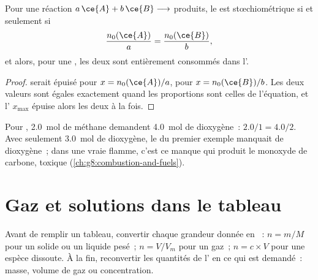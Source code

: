 \begin{proposition}\label{prop:g10:reaction-progress-table:together}
Pour une réaction $a\,\ce{A} + b\,\ce{B} \longrightarrow$ produits, le
 est stœchiométrique si et seulement si
\[
  \frac{n_0(\ce{A})}{a} = \frac{n_0(\ce{B})}{b},
\]
et alors, pour une , les deux  sont entièrement
consommés dans l'.
\end{proposition}

\begin{proof}
 serait épuisé pour $x = n_0(\ce{A})/a$,  pour
$x = n_0(\ce{B})/b$. Les deux valeurs sont égales exactement quand les
proportions sont celles de l'équation, et l' $x_{\max}$ épuise
alors les deux à la fois.
\end{proof}

\begin{example}\label{ex:g10:reaction-progress-table:stoich}
Pour , \qty{2.0}{mol} de méthane demandent
\qty{4.0}{mol} de dioxygène~: $2.0/1 = 4.0/2$. Avec seulement
\qty{3.0}{mol} de dioxygène, le  du premier exemple manquait de
dioxygène~; dans une vraie flamme, c'est ce manque qui produit le
monoxyde de carbone, toxique (\cref{ch:g8:combustion-and-fuels}).
\end{example}

\section{Gaz et solutions dans le tableau}


\begin{method}\label{met:g10:reaction-progress-table:amounts}
Avant de remplir un tableau, convertir chaque grandeur donnée en
~: $n = m/M$ pour un solide ou un liquide pesé~;
$n = V/V_m$ pour un gaz~; $n = c \times V$ pour une espèce dissoute. À
la fin, reconvertir les quantités de l' en ce qui est
demandé~: masse, volume de gaz ou concentration.
\end{method}

